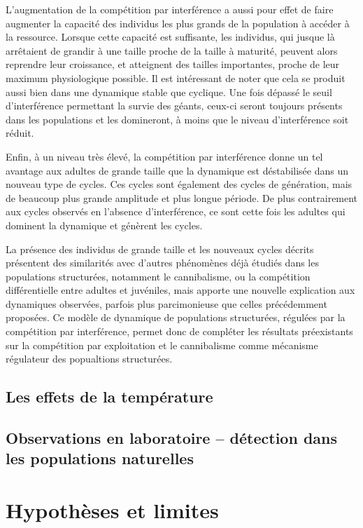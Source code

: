 L'augmentation de la compétition par interférence a aussi pour effet de faire
augmenter la capacité des individus les plus grands de la population à accéder à
la ressource. Lorsque cette capacité est suffisante, les individus, qui jusque
là arrêtaient de grandir à une taille proche de la taille à maturité, peuvent
alors reprendre leur croissance, et atteignent des tailles importantes, proche
de leur maximum physiologique possible. Il est intéressant de noter que cela se
produit aussi bien dans une dynamique stable que cyclique. Une fois dépassé le
seuil d'interférence permettant la survie des géants, ceux-ci seront toujours
présents dans les populations et les domineront, à moins que le niveau
d'interférence soit réduit. 

Enfin, à un niveau très élevé, la compétition par interférence donne un tel
avantage aux adultes de grande taille que la dynamique est déstabilisée dans un
nouveau type de cycles. Ces cycles sont également des
cycles de génération, mais de beaucoup plus grande amplitude et plus longue
période. De plus contrairement aux cycles observés en l'absence d'interférence,
ce sont cette fois les adultes qui dominent la dynamique et génèrent les cycles. 

La présence des individus de grande taille et les nouveaux cycles décrits
présentent des similarités avec d'autres phénomènes déjà étudiés dans les
populations structurées, notamment le cannibalisme, ou la compétition
différentielle entre adultes et juvéniles, mais apporte une nouvelle explication
aux dynamiques observées, parfois plus parcimonieuse que celles précédemment
proposées. Ce modèle de dynamique de populations structurées, régulées par la
compétition par interférence, permet donc de compléter les résultats
préexistants sur la compétition par exploitation et le cannibalisme comme
mécanisme régulateur des popualtions structurées. 

\subsection{Les effets de la température}

\subsection{Observations en laboratoire -- détection dans les populations
naturelles}

\section{Hypothèses et limites}

